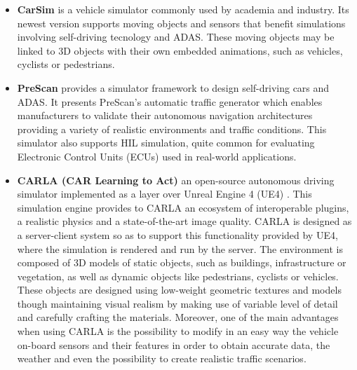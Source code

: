\begin{itemize}
	
	
	\item \textbf{CarSim} \cite{benekohal1988carsim} is a vehicle simulator commonly used by academia and industry. Its newest version supports moving objects and sensors that benefit simulations involving self-driving tecnology and ADAS. These moving objects may be linked to 3D objects with their own embedded animations, such as vehicles, cyclists or pedestrians.
	
	\item \textbf{PreScan} \cite{tideman2013simulation} provides a simulator framework to design self-driving cars and \ac{ADAS}. It presents PreScan's automatic traffic generator which enables manufacturers to validate their autonomous navigation architectures providing a variety of realistic environments and traffic conditions. This simulator also supports HIL simulation, quite common for evaluating Electronic Control Units (ECUs) used in real-world applications.
	
	\item \textbf{CARLA (CAR Learning to Act)} \cite{dosovitskiy2017carla} an open-source autonomous driving simulator implemented as a layer over Unreal Engine 4 (UE4) \cite{sanders2016introduction}. This simulation engine provides to CARLA an ecosystem of interoperable plugins, a realistic physics and a state-of-the-art image quality. CARLA is designed as a server-client system so as to support this functionality provided by UE4, where the simulation is rendered and run by the server. The environment is composed of 3D models of static objects, such as buildings, infrastructure or vegetation, as well as dynamic objects like pedestrians, cyclists or vehicles. These objects are designed using low-weight geometric textures and models though maintaining visual realism by making use of variable level of detail and carefully crafting the materials. Moreover, one of the main advantages when using CARLA is the possibility to modify in an easy way the vehicle on-board sensors and their features in order to obtain accurate data, the weather and even the possibility to create realistic traffic scenarios.
	

\end{itemize}
